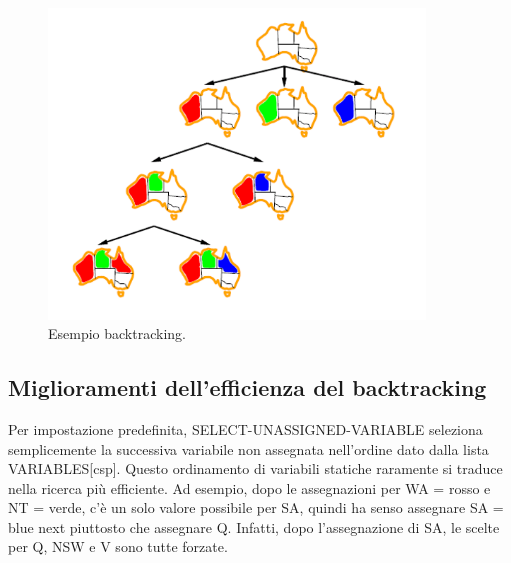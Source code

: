 \begin{figure}[H]
	\centering
    \includegraphics[width=10cm, keepaspectratio]{img/es_backtracking.png}
	\caption{Esempio backtracking.}\label{fig:es_backtracking}
\end{figure}

\subsection{Miglioramenti dell'efficienza del backtracking}
Per impostazione predefinita, SELECT-UNASSIGNED-VARIABLE seleziona semplicemente la successiva variabile non assegnata nell'ordine dato dalla lista VARIABLES[csp]. Questo ordinamento di variabili statiche raramente si traduce nella ricerca più efficiente. Ad esempio, dopo le assegnazioni per WA = rosso e NT = verde, c'è un solo valore possibile per SA, quindi ha senso assegnare SA = blue next piuttosto che assegnare Q. Infatti, dopo l'assegnazione di SA, le scelte per Q, NSW e V sono tutte forzate.
